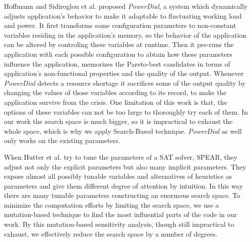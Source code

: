 Hoffmann and Sidiroglou et al.\cite{Hoffmann:2011:DKR:1961296.1950390} proposed \emph{PowerDial}, a system which dynamically adjusts application's behavior to make it adaptable to fluctuating working load and power. It first transforms some configuration parameters to non-constant variables residing in the application's memory, so the behavior of the application can be altered by controling these variables at runtime. Then it pre-runs the application with each possible configuration to abtain how these parameters influence the application, memorizes the Pareto-best candidates in terms of application's non-functional properties and the quality of the output. Whenever \emph{PowerDial} detects a resource shortage it sacrifices some of the output quality by changing the values of those variables according to its record, to make the application survive from the crisis. One limitation of this work is that, the options of these variables can not be too large to thoroughly try each of them. In our work the search space is much bigger, so it is impractical to exhaust the whole space, which is why we apply Search-Based technique. \emph{PowerDial} as well only works on the existing parameters.

When Hutter et al.\cite{4401979} try to tune the parameters of a SAT solver, SPEAR, they adjust not only the explicit parameters but also many implicit parameters. They expose almost all possibly tunable variables and alternatives of heuristics as parameters and give them different degree of attention by intuition. In this way there are many tunable parameters constructing an enormous search space. To minimize the computation efforts by limiting the search space, we use a mutation-based technique to find the most influential parts of the code in our work. By this mutation-based sensitivity analysis, though still impractical to exhaust, we effectively reduce the search space by a number of degrees.
